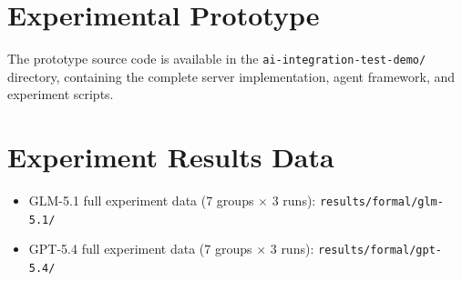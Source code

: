 \documentclass[sigconf,nonacm]{acmart}
\begin{document}



\appendix
\section{Experimental Prototype}

The prototype source code is available in the \texttt{ai-integration-test-demo/} directory, containing the complete server implementation, agent framework, and experiment scripts.

\section{Experiment Results Data}

\begin{itemize}
\item GLM-5.1 full experiment data (7 groups $\times$ 3 runs): \texttt{results/formal/glm-5.1/}
\item GPT-5.4 full experiment data (7 groups $\times$ 3 runs): \texttt{results/formal/gpt-5.4/}
\end{itemize}
\end{document}
